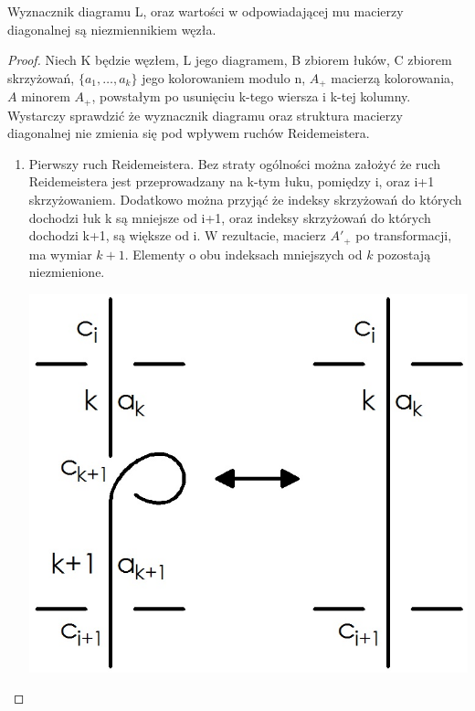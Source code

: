 \begin{twierdzenie}
Wyznacznik diagramu L, oraz wartości w odpowiadającej mu macierzy diagonalnej są niezmiennikiem węzła.
\end{twierdzenie}
\begin{proof}
Niech K będzie węzłem, L jego diagramem, B zbiorem łuków,  C zbiorem skrzyżowań, $\lbrace a_{1}, \ldots, a_{k}\rbrace$ jego kolorowaniem modulo n, $A_{+}$ macierzą kolorowania, $A$ minorem $A_{+}$, powstałym po usunięciu k-tego wiersza i k-tej kolumny. Wystarczy sprawdzić że wyznacznik diagramu oraz struktura macierzy diagonalnej nie zmienia się pod wpływem ruchów Reidemeistera.  
\begin{enumerate}
\item Pierwszy ruch Reidemeistera. Bez straty ogólności można założyć że ruch Reidemeistera jest przeprowadzany na k-tym łuku, pomiędzy i, oraz i+1 skrzyżowaniem. Dodatkowo można przyjąć że indeksy skrzyżowań do których dochodzi łuk k są mniejsze od i+1, oraz indeksy skrzyżowań do których dochodzi k+1, są większe od i. W rezultacie,  macierz $A'_{+}$  po transformacji, ma wymiar $k+1$. Elementy o obu indeksach mniejszych  od $k$ pozostają niezmienione.

\begin{minipage}{0.5\textwidth}
\begin{center}
			\includegraphics[scale=0.25]{2/Obrazy/R1det}
\end{center}
\end{minipage}
\begin{minipage}{0.5\textwidth}
\begin{center}


\end{center}
\end{minipage}
\end{enumerate}
\end{proof}
